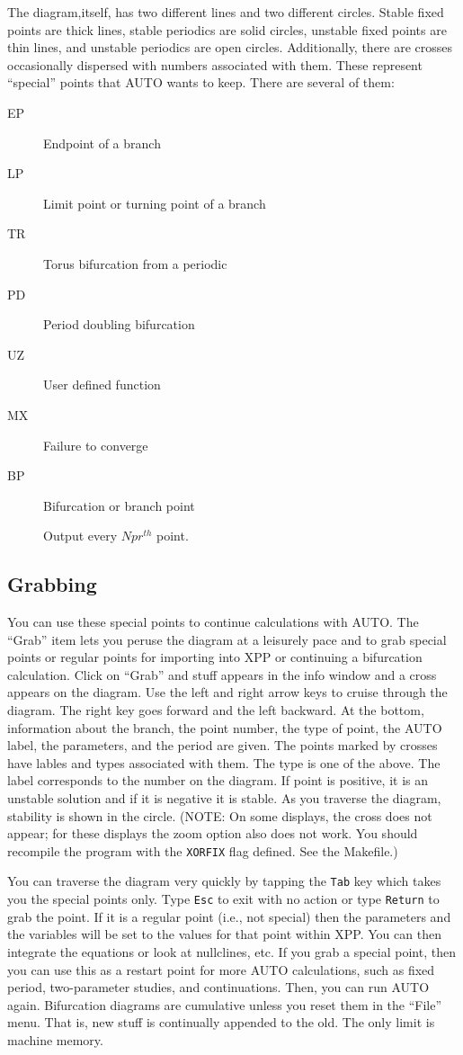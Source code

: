 \documentclass{article}
\begin{document}
The diagram,itself, has two different lines and two different circles.
Stable fixed points are thick lines, stable periodics are solid
circles, unstable fixed points are thin lines, and unstable periodics
are open circles. Additionally, there are crosses occasionally
dispersed with numbers associated with them.  These represent
``special'' points that AUTO wants to keep.  There are several of
them:
\begin{description}
\item[EP] Endpoint of a branch
\item[LP] Limit point or turning point of a branch
\item[TR] Torus bifurcation from a periodic
\item[PD] Period doubling bifurcation
\item[UZ] User defined function
\item[MX] Failure to converge  
\item[BP] Bifurcation or branch point
\item[  ] Output every $Npr^{th}$ point.
\end{description}

\subsection{Grabbing}

You can use these special points to continue calculations with AUTO.
The ``Grab'' item lets you peruse the diagram at a leisurely pace and
to grab special points or regular points for importing into XPP or
continuing a bifurcation calculation.  Click on ``Grab'' and stuff
appears in the info window and a cross appears on the diagram.  Use
the left and right arrow keys to cruise through the diagram. The right
key goes forward and the left backward.  At the bottom, information
about the branch, the point number, the type of point, the AUTO label,
the parameters, and the period are given. The points marked by crosses
have lables and types associated with them.  The type is one of the
above.  The label corresponds to the number on the diagram.  If point
is positive, it is an unstable solution and if it is negative it is
stable. As you traverse the diagram, stability is shown in the circle.
(NOTE: On some displays, the cross does not appear; for these displays
the zoom option also does not work.  You should recompile the program
with the {\tt XORFIX} flag defined.  See the Makefile.)

You can traverse the diagram very quickly by tapping the {\tt Tab} key
which takes you the special points only.  Type {\tt Esc} to exit with
no action or type {\tt Return} to grab the point.  If it is a regular
point (i.e., not special) then the parameters and the variables will
be set to the values for that point within XPP.  You can then
integrate the equations or look at nullclines, etc.  If you grab a
special point, then you can use this as a restart point for more AUTO
calculations, such as fixed period, two-parameter studies, and
continuations. Then, you can run AUTO again.  Bifurcation diagrams are
cumulative unless you reset them in the ``File'' menu.  That is, new
stuff is continually appended to the old.  The only limit is machine
memory.
\end{document}

